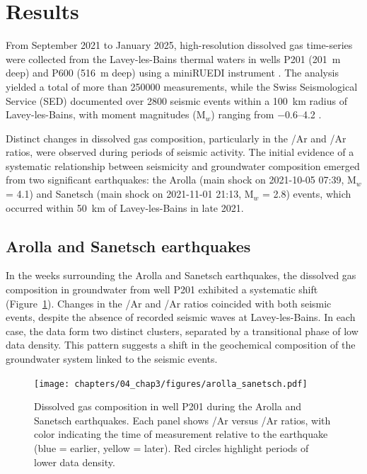 \section{Results}
From September 2021 to January 2025, high-resolution dissolved gas time-series were collected from the Lavey-les-Bains thermal waters in wells P201 (\SI{201}{\metre} deep) and P600 (\SI{516}{\metre} deep) using a miniRUEDI instrument \citep{brennwald2016portable, giroud2023new}.
The analysis yielded a total of more than \num{250000} measurements, while the Swiss Seismological Service (SED) documented over \num{2800} seismic events within a \SI{100}{\kilo\meter} radius of Lavey-les-Bains, with moment magnitudes (M$_w$) ranging from \SIrange{-0.6}{4.2}{} \citep{sed2025earthquakes}.

Distinct changes in dissolved gas composition, particularly in the /Ar and /Ar ratios, were observed during periods of seismic activity.
The initial evidence of a systematic relationship between seismicity and groundwater composition emerged from two significant earthquakes: the Arolla (main shock on 2021-10-05 07:39, M$_w$ = 4.1) and Sanetsch (main shock on 2021-11-01 21:13, M$_w$ = 2.8) events, which occurred within \SI{50}{\kilo\meter} of Lavey-les-Bains in late 2021.

\subsection{Arolla and Sanetsch earthquakes}
In the weeks surrounding the Arolla and Sanetsch earthquakes, the dissolved gas composition in groundwater from well P201 exhibited a systematic shift (Figure~\ref{fig:arolla_sanetsch}).
Changes in the /Ar and /Ar ratios coincided with both seismic events, despite the absence of recorded seismic waves at Lavey-les-Bains.
In each case, the data form two distinct clusters, separated by a transitional phase of low data density.
This pattern suggests a shift in the geochemical composition of the groundwater system linked to the seismic events.

\begin{figure}[H]
    \centering
    \texttt{[image: chapters/04\_chap3/figures/arolla\_sanetsch.pdf]}
    \caption{Dissolved gas composition in well P201 during the Arolla and Sanetsch earthquakes.
    Each panel shows /Ar versus /Ar ratios, with color indicating the time of measurement relative to the earthquake (blue = earlier, yellow = later).
    Red circles highlight periods of lower data density.
    }
    \label{fig:arolla_sanetsch}
\end{figure}

